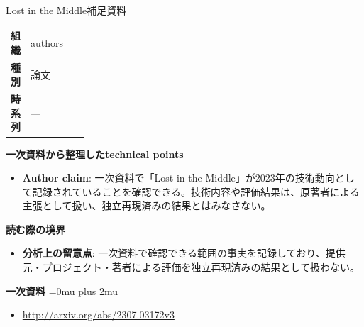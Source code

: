 \begin{technicalnote}{Lost in the Middle}{補足資料}
\begingroup
\begin{tabularx}{\linewidth}{@{}>{\bfseries}p{0.22\linewidth}X@{}}
組織 & authors \\
種別 & 論文 \\
時系列 & — \\
\end{tabularx}
\smallskip
{\bfseries 一次資料から整理したtechnical points}
\begin{itemize}[leftmargin=1.5em,itemsep=0.35em]
\item \textbf{Author claim}: 一次資料で「Lost in the Middle」が2023年の技術動向として記録されていることを確認できる。技術内容や評価結果は、原著者による主張として扱い、独立再現済みの結果とはみなさない。
\end{itemize}
\begin{minipage}{\linewidth}
{\bfseries 読む際の境界}
\begin{itemize}[leftmargin=1.5em,itemsep=0.35em]
\item \textbf{分析上の留意点}: 一次資料で確認できる範囲の事実を記録しており、提供元・プロジェクト・著者による評価を独立再現済みの結果として扱わない。
\end{itemize}
\begin{samepage}
{\bfseries 一次資料}
\begingroup\sloppy
\Urlmuskip=0mu plus 2mu\relax
\begin{itemize}[leftmargin=1.5em,itemsep=0.25em]
\item {\scriptsize\url{http://arxiv.org/abs/2307.03172v3}}
\end{itemize}
\endgroup
\end{samepage}
\end{minipage}
\endgroup
\end{technicalnote}
\medskip
